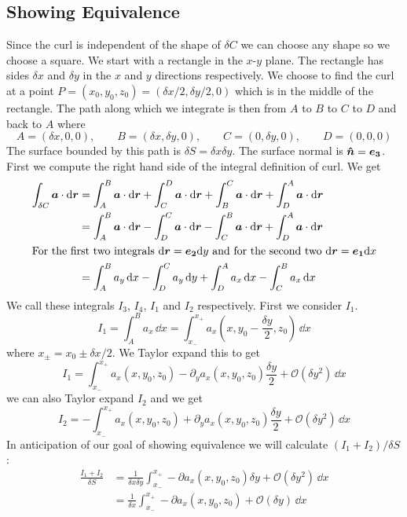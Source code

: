 \documentclass{article}
\begin{document}
    \subsection{Showing Equivalence}
    Since the curl is independent of the shape of \(\delta C\) we can choose any shape so we choose a square.
    We start with a rectangle in the \(x\)-\(y\) plane.
    The rectangle has sides \(\delta x\) and \(\delta y\) in the \(x\) and \(y\) directions respectively.
    We choose to find the curl at a point \(P = (x_0, y_0, z_0) = (\delta x/2, \delta y/2, 0)\) which is in the middle of the rectangle.
    The path along which we integrate is then from \(A\) to \(B\) to \(C\) to \(D\) and back to \(A\) where
    \[A = (\delta x, 0, 0),\qquad B = (\delta x, \delta y, 0),\qquad C = (0, \delta y, 0),\qquad D = (0, 0, 0)\]
    The surface bounded by this path is \(\delta S = \delta x\delta y\).
    The surface normal is \(\bm{\hat{n}} = \bm{e_{3}}\).
    First we compute the right hand side of the integral definition of curl.
    We get
    \begin{align*}
    \int_{\delta C}\bm{a}\cdot\dd\bm{r} &= \int_A^B\bm{a}\cdot\dd\bm{r} + \int_C^D\bm{a}\cdot\dd\bm{r} + \int_B^C\bm{a}\cdot\dd\bm{r} + \int_D^A\bm{a}\cdot\dd\bm{r}\\
    &= \int_A^B\bm{a}\cdot\dd\bm{r} - \int_D^C\bm{a}\cdot\dd\bm{r} - \int_C^B\bm{a}\cdot\dd\bm{r} + \int_D^A\bm{a}\cdot\dd\bm{r}\\
    \intertext{For the first two integrals \(\dd\bm{r} = \bm{e_{2}}\dd y\) and for the second two \(\dd\bm{r} = \bm{e_{1}}\dd x\)}
    &= \int_A^B a_y\,\dd x - \int_D^C a_y\,\dd y + \int_D^A a_x\,\dd x - \int_C^B a_x\,\dd x\\
    \end{align*}
    We call these integrals \(I_3\), \(I_4\), \(I_1\) and \(I_2\) respectively.
    First we consider \(I_1\).
    \[I_1 = \int_A^B a_x\,\dd x = \int_{x_-}^{x_+} a_x\left(x, y_0 - \frac{\delta y}{2}, z_0\right)\,\dd x\]
    where \(x_{\pm} = x_0\pm \delta x/2\).
    We Taylor expand this to get
    \[I_1 = \int_{x_-}^{x_+} a_x(x, y_0, z_0) - \partial_y a_x(x, y_0, z_0)\frac{\delta y}{2} + \mathcal{O}(\delta y^2)\,\dd x\]
    we can also Taylor expand \(I_2\) and we get
    \[I_2 = -\int_{x_-}^{x_+} a_x(x, y_0, z_0) + \partial_y a_x(x, y_0, z_0)\frac{\delta y}{2} + \mathcal{O}(\delta y^2)\,\dd x\]
    In anticipation of our goal of showing equivalence we will calculate \((I_1 + I_2)/\delta S\):
    \begin{align*}
    \frac{I_1 + I_2}{\delta S} &= \frac{1}{\delta x\delta y}\int_{x_-}^{x_+}-\partial a_x(x, y_0, z_0)\delta y + \mathcal{O}(\delta y^2)\,\dd x\\
    &= \frac{1}{\delta x}\int_{x_-}^{x_+}-\partial a_x(x, y_0, z_0) + \mathcal{O}(\delta y)\,\dd x
    \end{align*}
\end{document}
